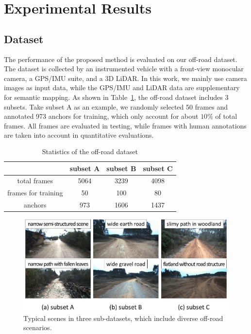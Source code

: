 \documentclass[letterpaper, 10 pt, conference]{ieeeconf}  %
\begin{document}
\section{Experimental Results}	\label{exp}
\subsection{Dataset}
The performance of the proposed method is evaluated on our off-road dataset. The dataset is collected by an instrumented vehicle with a front-view monocular camera, a GPS/IMU suite, and a 3D LiDAR. In this work, we mainly use camera images as input data, while the GPS/IMU and LiDAR data are supplementary for semantic mapping.
As shown in Table~\ref{tab:dataset}, the off-road dataset includes 3 subsets. Take subset A as an example, we randomly selected 50 frames and annotated 973 anchors for training, which only account for about $10\%$ of total frames. All frames are evaluated in testing, while frames with human annotations are taken into account in quantitative evaluations.

\begin{table}[]
	\centering
	\caption{Statistics of the off-road dataset}
	\label{tab:dataset}
	\begin{tabular}{cccc} 
		\hline
		& subset A & subset B & subset C  \\ 
		\hline
		total frames        & 5064     & 3239     & 4098      \\
		frames for training & 50       & 100      & 80        \\
		anchors       & 973      & 1606     & 1437      \\
		\hline
	\end{tabular}
\end{table}

\begin{figure}[]
	\centering
	\includegraphics[scale=0.28]{dataset.pdf}
	\caption{Typical scenes in three sub-datasets, which include diverse off-road scenarios.}
	\label{fig:dataset}
\end{figure}
\end{document}
